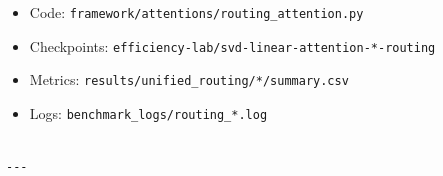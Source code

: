 \begin{itemize}
\item Code: \texttt{framework/attentions/routing\_attention.py}
\item Checkpoints: \texttt{efficiency-lab/svd-linear-attention-*-routing}
\item Metrics: \texttt{results/unified\_routing/*/summary.csv}
\item Logs: \texttt{benchmark\_logs/routing\_*.log}
\end{itemize}
\begin{lstlisting}

---
\end{lstlisting}
